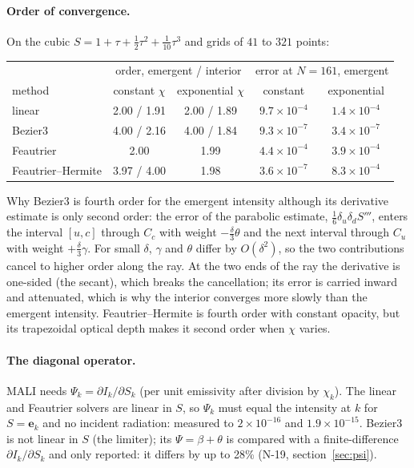 \documentclass[11pt,a4paper]{article}
\begin{document}
\paragraph{Order of convergence.} On the cubic
$S = 1+\tau+\tfrac12\tau^2+\tfrac1{10}\tau^3$ and grids of $41$ to
$321$ points:
\begin{center}
\begin{tabular}{lcccc}
\toprule
& \multicolumn{2}{c}{order, emergent / interior} & \multicolumn{2}{c}{error at $N=161$, emergent}\\
method & constant $\chi$ & exponential $\chi$ & constant & exponential\\
\midrule
linear & 2.00 / 1.91 & 2.00 / 1.89 & $9.7\times10^{-4}$ & $1.4\times10^{-4}$\\
Bezier3 & 4.00 / 2.16 & 4.00 / 1.84 & $9.3\times10^{-7}$ & $3.4\times10^{-7}$\\
Feautrier & 2.00 & 1.99 & $4.4\times10^{-4}$ & $3.9\times10^{-4}$\\
Feautrier--Hermite & 3.97 / 4.00 & 1.98 & $3.6\times10^{-7}$ & $8.3\times10^{-4}$\\
\bottomrule
\end{tabular}
\end{center}
Why Bezier3 is fourth order for the emergent intensity although its
derivative estimate is only second order: the error of the parabolic
estimate, $\tfrac16\delta_u\delta_dS'''$, enters the interval
$[u,c]$ through $C_c$ with weight $-\tfrac\delta3\theta$ and the next
interval through $C_u$ with weight $+\tfrac\delta3\gamma$. For small
$\delta$, $\gamma$ and $\theta$ differ by $O(\delta^2)$, so the two
contributions cancel to higher order along the ray. At the two ends of
the ray the derivative is one-sided (the secant), which breaks the
cancellation; its error is carried inward and attenuated, which is why
the interior converges more slowly than the emergent intensity.
Feautrier--Hermite \citep{1976JQSRT..16..931A} is fourth order with constant opacity, but its
trapezoidal optical depth makes it second order when $\chi$ varies.

\paragraph{The diagonal operator.} MALI needs $\Psi_k = \partial
I_k/\partial S_k$ (per unit emissivity after division by $\chi_k$). The
linear and Feautrier solvers are linear in $S$, so $\Psi_k$ must equal
the intensity at $k$ for $S=\boldsymbol e_k$ and no incident radiation:
measured to $2\times10^{-16}$ and $1.9\times10^{-15}$. Bezier3 is not
linear in $S$ (the limiter); its $\Psi = \beta+\theta$ is compared with a
finite-difference $\partial I_k/\partial S_k$ and only reported:
it differs by up to 28\% (N-19, section~\ref{sec:psi}).
\end{document}
